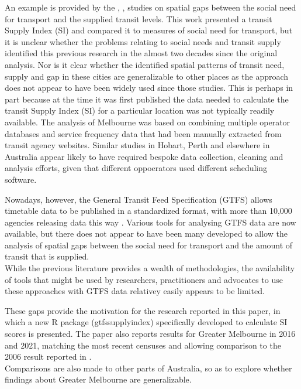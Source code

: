\documentclass[preprint, 3p,
authoryear]{elsarticle} %
\begin{document}
An example is provided by the \citet{Currie2003Hobart}
\citet{Currie2004Gap}, \citet{Currie2007Identifying},
\citet{currie2010identifying} studies on spatial gaps between the social
need for transport and the supplied transit levels. This work presented
a transit Supply Index (SI) and compared it to measures of social need
for transport, but it is unclear whether the problems relating to social
needs and transit supply identified this previous research in the almost
two decades since the original analysis. Nor is it clear whether the
identified spatial patterns of transit need, supply and gap in these
cities are generalizable to other places as the
\citet{currie2010identifying} approach does not appear to have been
widely used since those studies. This is perhaps in part because at the
time it was first published the data needed to calculate the transit
Supply Index (SI) for a particular location was not typically readily
available. The \citet{currie2010identifying} analysis of Melbourne was
based on combining multiple operator databases and service frequency
data that had been manually extracted from transit agency websites.
Similar studies in Hobart, Perth and elsewhere in Australia \citep[
\citet{Currie2004Gap}, \citet{Currie2007Identifying},
\citet{currie2010identifying}]{Currie2003Hobart} appear likely to have
required bespoke data collection, cleaning and analysis efforts, given
that different oppoerators used different scheduling software.

Nowadays, however, the General Transit Feed Specification (GTFS) allows
timetable data to be published in a standardized format, with more than
10,000 agencies releasing data this way \citep{GTFS}. Various tools for
analysing GTFS data are now available, but there does not appear to have
been many developed to allow the analysis of spatial gaps between the
social need for transport and the amount of transit that is supplied.\\
While the previous literature provides a wealth of methodologies, the
availability of tools that might be used by researchers, practitioners
and advocates to use these approaches with GTFS data relativey easily
appears to be limited.

These gaps provide the motivation for the research reported in this
paper, in which a new R package (gtfssupplyindex) specifically developed
to calculate SI scores is presented. The paper also reports results for
Greater Melbourne in 2016 and 2021, matching the most recent censuses
and allowing comparison to the 2006 result reported in
\citet{currie2010identifying}.\\
Comparisons are also made to other parts of Australia, so as to explore
whether findings about Greater Melbourne are generalizable.
\end{document}
